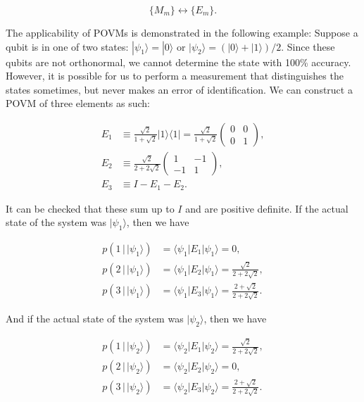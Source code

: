 \documentclass{article}
\begin{document}
        \[\{M_m\} \longleftrightarrow \{E_m\}.\]

      The applicability of POVMs is demonstrated in the following example: Suppose a qubit is in one of two states: $|\psi_1 \rangle = |0 \rangle$ or $|\psi_2 \rangle = (|0 \rangle + |1 \rangle)/2$. Since these qubits are not orthonormal, we cannot determine the state with 100\% accuracy. However, it is possible for us to perform a measurement that distinguishes the states sometimes, but never makes an error of identification. We can construct a POVM of three elements as such:

      \begin{align*}
        E_1 & \equiv \frac{\sqrt{2}}{1 + \sqrt{2}} |1\rangle \langle 1| = \frac{\sqrt{2}}{1 + \sqrt{2}} \begin{pmatrix} 0&0\\0&1 \end{pmatrix}, \\
        E_2 & \equiv \frac{\sqrt{2}}{2 + 2 \sqrt{2}} \begin{pmatrix} 1 & -1 \\ -1 & 1 \end{pmatrix}, \\
        E_3 & \equiv I - E_1 - E_2.
      \end{align*}

      It can be checked that these sum up to $I$ and are positive definite. If the actual state of the system was $|\psi_1 \rangle$, then we have

      \begin{align*}
        p(1 \,|\, |\psi_1 \rangle) & = \langle \psi_1 | E_1 | \psi_1 \rangle = 0, \\
        p(2 \,|\, |\psi_1 \rangle) & = \langle \psi_1 | E_2 | \psi_1 \rangle = \frac{\sqrt{2}}{2 + 2\sqrt{2}}, \\
        p(3 \,|\, |\psi_1 \rangle) & = \langle \psi_1 | E_3 | \psi_1 \rangle =  \frac{2 + \sqrt{2}}{2 + 2\sqrt{2}}.
      \end{align*}

      And if the actual state of the system was $|\psi_2 \rangle$, then we have

      \begin{align*}
        p(1 \,|\, |\psi_2 \rangle) & = \langle \psi_2 | E_1 | \psi_2 \rangle = \frac{\sqrt{2}}{2 + 2\sqrt{2}}, \\
        p(2 \,|\, |\psi_2 \rangle) & = \langle \psi_2 | E_2 | \psi_2 \rangle = 0, \\
        p(3 \,|\, |\psi_2 \rangle) & = \langle \psi_2 | E_3 | \psi_2 \rangle =  \frac{2 + \sqrt{2}}{2 + 2\sqrt{2}}.
      \end{align*}
\end{document}
